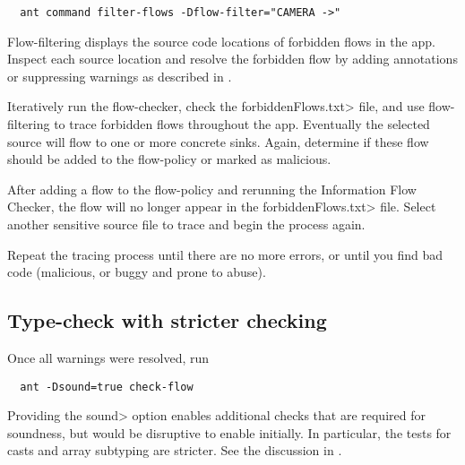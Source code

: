 \begin{Verbatim}
  ant command filter-flows -Dflow-filter="CAMERA ->"
\end{Verbatim}

Flow-filtering displays the source code locations of forbidden flows in the app.
Inspect each source location and resolve the forbidden flow by adding annotations
or suppressing warnings as described in .

Iteratively run the flow-checker, check the \<forbiddenFlows.txt> file, and use flow-filtering
to trace forbidden flows throughout the app.  Eventually the selected source will flow
to one or more concrete sinks. Again, determine if these flow should be added to the flow-policy
or marked as malicious.

After adding a flow to the flow-policy and rerunning the Information Flow Checker, the flow
will no longer appear in the \<forbiddenFlows.txt> file. Select another sensitive
source file to trace and begin the process again.

Repeat the tracing process until there are no more errors, or until you find bad code
(malicious, or buggy and prone to abuse).

\subsection{Type-check with stricter checking}

Once all warnings were resolved, run 

\begin{Verbatim}
  ant -Dsound=true check-flow
\end{Verbatim}

\noindent
Providing the \<sound> option enables additional checks that are
required for soundness, but would be disruptive to enable initially.
In particular, the tests for casts and array subtyping are stricter.
See the discussion in .



